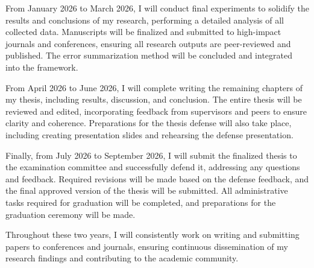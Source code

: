 From January 2026 to March 2026, I will conduct final experiments to solidify the results and conclusions of my research, performing a detailed analysis of all collected data. Manuscripts will be finalized and submitted to high-impact journals and conferences, ensuring all research outputs are peer-reviewed and published. The error summarization method will be concluded and integrated into the framework.

From April 2026 to June 2026, I will complete writing the remaining chapters of my thesis, including results, discussion, and conclusion. The entire thesis will be reviewed and edited, incorporating feedback from supervisors and peers to ensure clarity and coherence. Preparations for the thesis defense will also take place, including creating presentation slides and rehearsing the defense presentation.

Finally, from July 2026 to September 2026, I will submit the finalized thesis to the examination committee and successfully defend it, addressing any questions and feedback. Required revisions will be made based on the defense feedback, and the final approved version of the thesis will be submitted. All administrative tasks required for graduation will be completed, and preparations for the graduation ceremony will be made.

Throughout these two years, I will consistently work on writing and submitting papers to conferences and journals, ensuring continuous dissemination of my research findings and contributing to the academic community.



  
